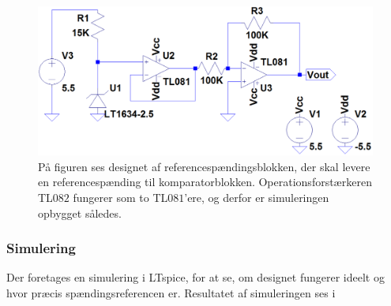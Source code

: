 \begin{figure}[H]
	\centering
	\includegraphics[scale=0.4]{figures/cProblemloesning/Reference_komparator.PNG}
	\caption{På figuren ses designet af referencespændingsblokken, der skal levere en referencespænding til komparatorblokken. Operationsforstærkeren TL$082$ fungerer som to TL$081$'ere, og derfor er simuleringen opbygget således. \cite{Corporation2013}}
	\label{fig:ref_komparator}
\end{figure}

\subsubsection{Simulering}
Der foretages en simulering i LTspice, for at se, om designet fungerer ideelt og hvor præcis spændingsreferencen er. Resultatet af simuleringen ses i 

